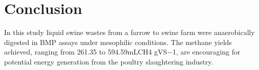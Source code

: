\section{Conclusion}
In this study liquid swine wastes from a farrow to  swine farm were anaerobically digested in BMP assays under mesophilic conditions. The methane yields achieved, ranging from 261.35 to 594.59mLCH4 gVS−1, are encouraging for potential energy generation from the poultry slaughtering industry.